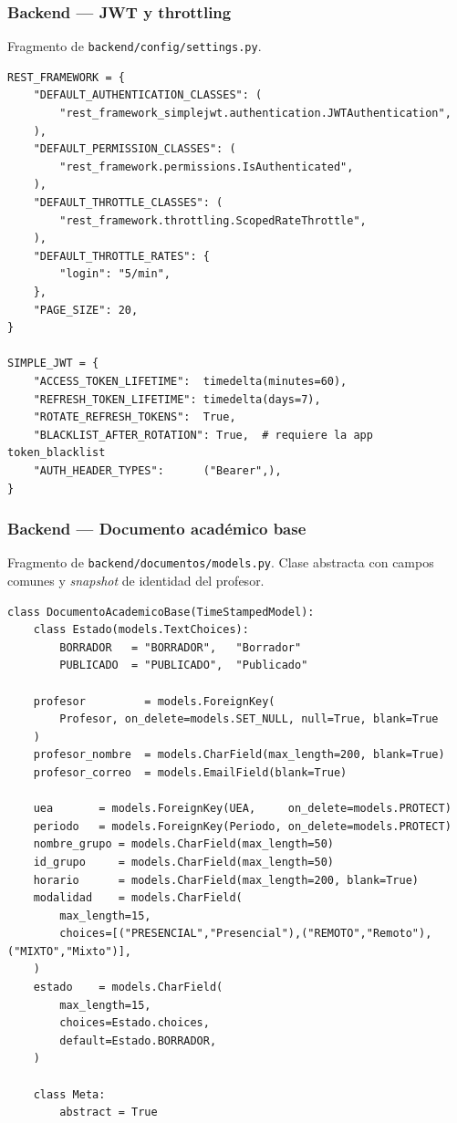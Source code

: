 \subsubsection{Backend --- JWT y throttling}

Fragmento de \texttt{backend/config/settings.py}.

\begin{lstlisting}[language={[3]Python}]
REST_FRAMEWORK = {
    "DEFAULT_AUTHENTICATION_CLASSES": (
        "rest_framework_simplejwt.authentication.JWTAuthentication",
    ),
    "DEFAULT_PERMISSION_CLASSES": (
        "rest_framework.permissions.IsAuthenticated",
    ),
    "DEFAULT_THROTTLE_CLASSES": (
        "rest_framework.throttling.ScopedRateThrottle",
    ),
    "DEFAULT_THROTTLE_RATES": {
        "login": "5/min",
    },
    "PAGE_SIZE": 20,
}

SIMPLE_JWT = {
    "ACCESS_TOKEN_LIFETIME":  timedelta(minutes=60),
    "REFRESH_TOKEN_LIFETIME": timedelta(days=7),
    "ROTATE_REFRESH_TOKENS":  True,
    "BLACKLIST_AFTER_ROTATION": True,  # requiere la app token_blacklist
    "AUTH_HEADER_TYPES":      ("Bearer",),
}
\end{lstlisting}

\subsubsection{Backend --- Documento académico base}

Fragmento de \texttt{backend/documentos/models.py}. Clase abstracta con campos comunes y \emph{snapshot} de identidad del profesor.

\begin{lstlisting}[language={[3]Python}]
class DocumentoAcademicoBase(TimeStampedModel):
    class Estado(models.TextChoices):
        BORRADOR   = "BORRADOR",   "Borrador"
        PUBLICADO  = "PUBLICADO",  "Publicado"

    profesor         = models.ForeignKey(
        Profesor, on_delete=models.SET_NULL, null=True, blank=True
    )
    profesor_nombre  = models.CharField(max_length=200, blank=True)
    profesor_correo  = models.EmailField(blank=True)

    uea       = models.ForeignKey(UEA,     on_delete=models.PROTECT)
    periodo   = models.ForeignKey(Periodo, on_delete=models.PROTECT)
    nombre_grupo = models.CharField(max_length=50)
    id_grupo     = models.CharField(max_length=50)
    horario      = models.CharField(max_length=200, blank=True)
    modalidad    = models.CharField(
        max_length=15,
        choices=[("PRESENCIAL","Presencial"),("REMOTO","Remoto"),("MIXTO","Mixto")],
    )
    estado    = models.CharField(
        max_length=15,
        choices=Estado.choices,
        default=Estado.BORRADOR,
    )

    class Meta:
        abstract = True
\end{lstlisting}

